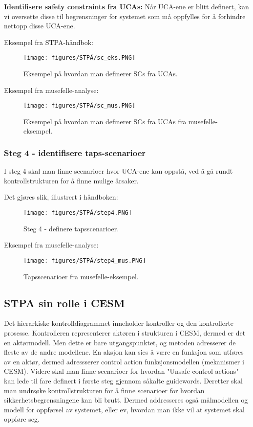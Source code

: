 \textbf{Identifisere safety constraints fra UCAs:}
Når UCA-ene er blitt definert, kan vi oversette disse til begrensninger for systemet som må oppfylles for å forhindre nettopp disse UCA-ene. 

Eksempel fra STPA-håndbok:


\begin{figure}[H]
    \centering
        \texttt{[image: figures/STPÅ/sc\_eks.PNG]}\\
        \caption{Eksempel på hvordan man definerer SCs fra UCAs.}
\end{figure}

Eksempel fra musefelle-analyse:

\begin{figure}[H]
    \centering
        \texttt{[image: figures/STPÅ/sc\_mus.PNG]}\\
        \caption{Eksempel på hvordan man definerer SCs fra UCAs fra musefelle-eksempel.}
\end{figure}

\subsubsection{Steg 4 - identifisere taps-scenarioer}

I steg 4 skal man finne scenarioer hvor UCA-ene kan oppstå, ved å gå rundt kontrollstrukturen for å finne mulige årsaker.

Det gjøres slik, illustrert i håndboken:

\begin{figure}[H]
    \centering
        \texttt{[image: figures/STPÅ/step4.PNG]}\\
        \caption{Steg 4 - definere tapsscenarioer.}
\end{figure}

Eksempel fra musefelle-analyse:

\begin{figure}[H]
    \centering
        \texttt{[image: figures/STPÅ/step4\_mus.PNG]}\\
        \caption{Tapsscenarioer fra musefelle-eksempel.}
\end{figure}


\subsection{STPA sin rolle i CESM}

Det hierarkiske kontrolldiagrammet inneholder kontroller og den kontrollerte prosesse. Kontrolleren representerer aktøren i strukturen i CESM, dermed er det en aktørmodell. Men dette er bare utgangspunktet, og metoden adresserer de fleste av de andre modellene. En aksjon kan sies å være en funksjon som utføres av en aktør, dermed adressserer control action funksjonsmodellen (mekanismer i CESM). Videre skal man finne scenarioer for hvordan "Unsafe control actions" kan lede til fare definert i første steg gjennom såkalte guidewords. Deretter skal man undrsøke kontrollstrukturen for å finne scenarioer for hvordan sikkerhetsbegrensningene kan bli brutt. Dermed addresseres også målmodellen og modell for oppførsel av systemet, eller ev, hvordan man ikke vil at systemet skal oppføre seg. 

